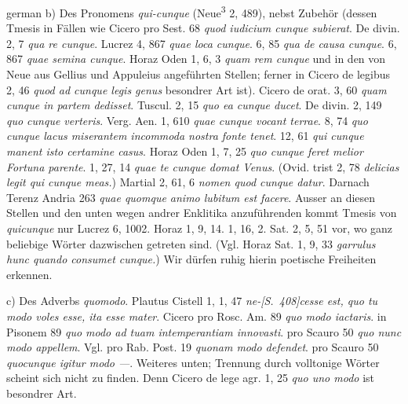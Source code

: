 \begin{otherlanguage*}{german}
b)	Des Pronomens \emph{qui-cunque} (Neue\textsuperscript{3} 2, 489), nebst Zubehör (dessen Tmesis in Fällen wie Cicero pro Sest. 68 \emph{quod iudicium cunque subierat}. De divin. 2, 7 \emph{qua re cunque}. Lucrez 4, 867 \emph{quae loca cunque}. 6, 85 \emph{qua de causa cunque}. 6, 867 \emph{quae semina cunque}. Horaz Oden 1, 6, 3 \emph{quam rem cunque} und in den von Neue aus Gellius und Appuleius angeführten Stellen; ferner in Cicero de legibus 2, 46 \emph{quod ad cunque legis genus} besondrer Art ist). Cicero de orat. 3, 60 \emph{quam  cunque in partem dedisset}. Tuscul. 2, 15 \emph{quo ea  cunque ducet}. De divin. 2, 149 \emph{quo  cunque verteris}. Verg. Aen. 1, 610 \emph{quae  cunque vocant terrae}. 8, 74 \emph{quo  cunque lacus miserantem incommoda nostra fonte tenet}. 12, 61 \emph{qui  cunque manent isto certamine casus}. Horaz Oden 1, 7, 25 \emph{quo  cunque feret melior Fortuna parente}. 1, 27, 14 \emph{quae te cunque domat Venus}. (Ovid. trist 2, 78 \emph{delicias legit qui  cunque meas.}) Martial 2, 61, 6 \emph{nomen quod  cunque datur}. Darnach Terenz Andria 263 \emph{quae  quomque animo lubitum est facere}. Ausser an diesen Stellen und den unten wegen andrer Enklitika anzuführenden kommt Tmesis von \emph{quicunque} nur Lucrez 6, 1002. Horaz 1, 9, 14. 1, 16, 2. Sat. 2, 5, 51 vor, wo ganz beliebige Wörter dazwischen getreten sind. (Vgl. Horaz Sat. 1, 9, 33 \emph{garrulus hunc quando consumet cunque.}) Wir dürfen ruhig hierin poetische Freiheiten erkennen.

c)	Des Adverbs \emph{quomodo}. Plautus Cistell 1, 1, 47 \emph{ne-}\hypertarget{p408}{\emph{[S.~408]}}\label{p408}\emph{cesse est, quo tu  modo voles esse, ita esse mater}. Cicero pro Rosc. Am. 89 \emph{quo  modo iactaris}. in Pisonem 89 \emph{quo  modo ad tuam intemperantiam innovasti}. pro Scauro 50 \emph{quo  nunc modo appellem}. Vgl. pro Rab. Post. 19 \emph{quonam  modo defendet}. pro Scauro 50 \emph{quocunque igitur  modo —}. Weiteres unten; Trennung durch volltonige Wörter scheint sich nicht zu finden. Denn Cicero de lege agr. 1, 25 \emph{quo uno modo} ist besondrer Art.


\end{otherlanguage*}
